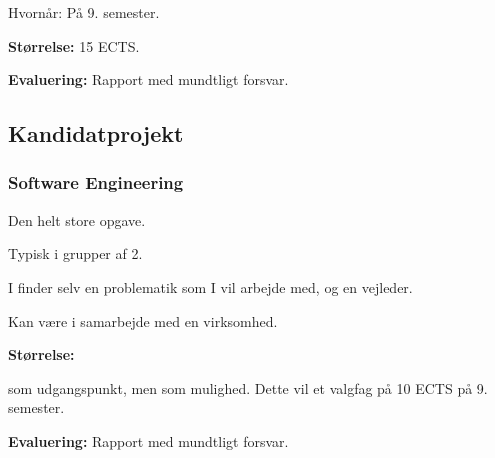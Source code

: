{\begin{frame}[fragile]
  \pause
  \vspace{5mm}
  Hvornår: På 9. semester.
  
  \pause
  \vspace{5mm}
  \textbf{Størrelse:} 15 ECTS.
  
  \pause
  \vspace{5mm}
  \textbf{Evaluering:} Rapport med mundtligt forsvar.
\end{frame}

\subsection{Kandidatprojekt}
\begin{frame}[fragile]
  \frametitle{Software Engineering }
  \vspace{3mm}
  Den helt store opgave.
  
  \pause
  \vspace{5mm}
  Typisk i grupper af 2.
  
  \pause
  \vspace{5mm}
  I finder selv en problematik som I vil arbejde med, og en vejleder.
  
  \pause
  \vspace{5mm}
  Kan være i samarbejde med en virksomhed.
  
  \pause
  \vspace{5mm}
  \textbf{Størrelse:}
  \begin{itemize}
     som udgangspunkt\pause, men
     som mulighed. Dette vil  et valgfag på 10 ECTS på 9. semester.
  \end{itemize}
  
  \pause
  \vspace{5mm}
  \textbf{Evaluering:} Rapport med mundtligt forsvar.
\end{frame}

}


